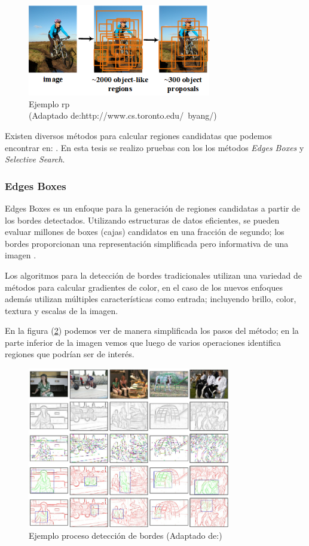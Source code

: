 \begin{figure}[H]
 \centering
  \includegraphics[height=4cm,keepaspectratio=true,clip=true]{imagenes/Logos/regionProposal.png}
  \caption{Ejemplo \ac{rp} \\ (Adaptado de:{http://www.cs.toronto.edu/~byang/})}
	\label{Fig: propsalregion}
\end{figure}

Existen diversos métodos para calcular regiones candidatas que podemos encontrar en: \citep{proposal}. En esta tesis se realizo pruebas con los  los métodos \textit{Edges Boxes} y \textit{Selective Search}.

\subsubsection*{Edges Boxes} \label{sub:edgesboxes}

Edges Boxes es un enfoque para la generación de regiones candidatas a partir de los bordes detectados. Utilizando estructuras de datos eficientes, se pueden evaluar millones de boxes (cajas) candidatos en una fracción de segundo; los bordes proporcionan una representación simplificada pero informativa de una imagen \citep{edges}.

Los algoritmos para la detección de bordes tradicionales utilizan una variedad de métodos para calcular gradientes de color, en el caso de los nuevos enfoques además utilizan múltiples características como entrada; incluyendo brillo, color, textura y  escalas de la imagen. 

En la figura (\ref{Fig: edges}) podemos ver de manera simplificada los pasos del método;  en la parte inferior de la imagen vemos que luego de varios operaciones identifica regiones que podrían ser de interés.

\begin{figure}[H]
 \centering
  \includegraphics[height=7cm,keepaspectratio=true,clip=true]{imagenes/Logos/edges.png}
  \caption{Ejemplo proceso detección de bordes (Adaptado de:\citep{edges})}
	\label{Fig: edges}
\end{figure}

